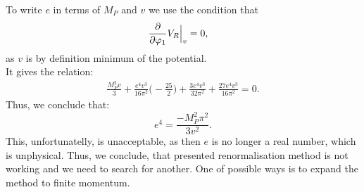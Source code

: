 To write $e$ in terms of $M_P$ and $v$ we use the condition that 
\begin{align}
\frac{\partial }{\partial \varphi_1}V_R\Big|_{v} &= 0, 
\end{align}
as $v$ is by definition minimum of the potential. \\
It gives the relation:
\begin{align}
\frac{M_P^2v}{3}+\frac{e^4v^3}{16\pi^2}\Big(-\frac{25}{2}\Big)+\frac{3e^4v^3}{32\pi^2}+
\frac{27e^4v^3}{16\pi^2} = 0.
\end{align}
Thus, we conclude that: 
\begin{equation}
e^4=\frac{-M_P^2\pi^2}{3v^2}.
\end{equation}
This, unfortunatelly, is unacceptable, as then $e$ is no longer a real number, which is 
unphysical.
Thus, we conclude, that presented renormalisation method is not working and we need to search for 
another. One of possible ways is to expand the method to finite momentum. \\
